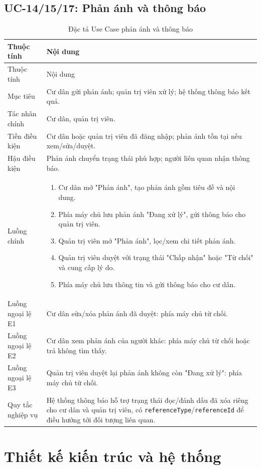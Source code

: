 ﻿\documentclass[12pt,a4paper]{report}
\begin{document}
\section{UC-14/15/17: Phản ánh và thông báo}
\begin{longtable}{L{4cm} L{10.5cm}}
\caption{Đặc tả Use Case phản ánh và thông báo}\label{tab:uc-report-notification}\\
\toprule
Thuộc tính & Nội dung \\
\midrule
\endfirsthead
\toprule Thuộc tính & Nội dung \\\midrule
\endhead
Mục tiêu & Cư dân gửi phản ánh; quản trị viên xử lý; hệ thống thông báo kết quả. \\
Tác nhân chính & Cư dân, quản trị viên. \\
Tiền điều kiện & Cư dân hoặc quản trị viên đã đăng nhập; phản ánh tồn tại nếu xem/sửa/duyệt. \\
Hậu điều kiện & Phản ánh chuyển trạng thái phù hợp; người liên quan nhận thông báo. \\
Luồng chính & \begin{enumerate}
\item Cư dân mở "Phản ánh", tạo phản ánh gồm tiêu đề và nội dung.
\item Phía máy chủ lưu phản ánh "Đang xử lý", gửi thông báo cho quản trị viên.
\item Quản trị viên mở "Phản ánh", lọc/xem chi tiết phản ánh.
\item Quản trị viên duyệt với trạng thái "Chấp nhận" hoặc "Từ chối" và cung cấp lý do.
\item Phía máy chủ lưu thông tin và gửi thông báo cho cư dân.
\end{enumerate} \\
Luồng ngoại lệ E1 & Cư dân sửa/xóa phản ánh đã duyệt: phía máy chủ từ chối. \\
Luồng ngoại lệ E2 & Cư dân xem phản ánh của người khác: phía máy chủ từ chối hoặc trả không tìm thấy. \\
Luồng ngoại lệ E3 & Quản trị viên duyệt lại phản ánh không còn "Đang xử lý": phía máy chủ từ chối. \\
Quy tắc nghiệp vụ & Hệ thống thông báo hỗ trợ trạng thái đọc/đánh dấu đã xóa riêng cho cư dân và quản trị viên, có \texttt{referenceType}/\texttt{referenceId} để điều hướng tới đối tượng liên quan. \\
\bottomrule
\end{longtable}

\chapter{Thiết kế kiến trúc và hệ thống}
\end{document}
